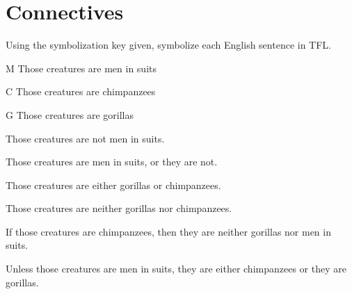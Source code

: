 


\chapter{Connectives}\setcounter{ProbPart}{0}
\problempart Using the symbolization key given, symbolize each English sentence in TFL.\label{pr.monkeysuits}
	\begin{ekey}
		\item[M] Those creatures are men in suits
		\item[C] Those creatures are chimpanzees
		\item[G] Those creatures are gorillas
	\end{ekey}
\begin{compactlist}
\item Those creatures are not men in suits.
\item[] 
\item Those creatures are men in suits, or they are not.
\item[]  
\item Those creatures are either gorillas or chimpanzees.
\item[] 
\item Those creatures are neither gorillas nor chimpanzees.
\item[] 
\item If those creatures are chimpanzees, then they are neither gorillas nor men in suits.
\item[] 
\item Unless those creatures are men in suits, they are either chimpanzees or they are gorillas.
\item[] 
\end{compactlist}

